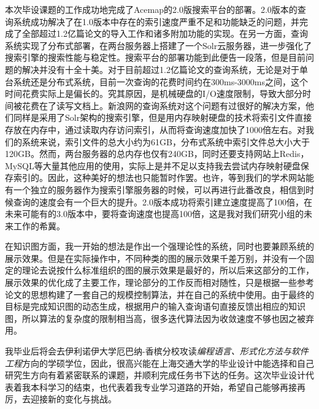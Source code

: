 
\begin{summary}

本次毕设课题的工作成功地完成了Acemap的2.0版搜索平台的部署。2.0版本的查询系统成功解决了在1.0版本中存在的索引速度严重不足和功能缺乏的问题，并完成了全部超过1.2亿篇论文的导入工作和诸多附加功能的实现。在另一方面，查询系统实现了分布式部署，在两台服务器上搭建了一个Solr云服务器，进一步强化了搜索引擎的搜索性能与稳定性。搜索平台的部署功能到此便告一段落，但是目前问题的解决并没有十全十美。对于目前超过1.2亿篇论文的查询系统，无论是对于单台系统还是分布式系统，目前一次查询的花费时间约在300ms-3000ms之间，这个时间花费实际上是偏长的。究其原因，是机械硬盘的I/O速度限制，导致大部分时间被花费在了读写文档上。新浪网的查询系统对这个问题有过很好的解决方案，他们同样是采用了Solr架构的搜索引擎，但是用内存映射硬盘的技术将索引文件直接存放在内存中，通过读取内存访问索引，从而将查询速度加快了1000倍左右。对我们的系统来说，索引文件的总大小约为61GB，分布式系统中索引文件总大小大于120GB。然而，两台服务器的总内存也仅有240GB，同时还要支持网站上Redis，MySQL等大量其他应用的使用，实际上是并不足以支持我去尝试内存映射硬盘保存索引的。因此，这种美好的想法也只能暂时作罢。也许，等到我们的学术网站能有一个独立的服务器作为搜索引擎服务器的时候，可以再进行此番改良，相信到时候查询的速度会有一个巨大的提升。2.0版本成功将索引建立速度提高了100倍，在未来可能有的3.0版本中，要将查询速度也提高100倍，这是我对我们研究小组的未来工作的希冀。

在知识图方面，我一开始的想法是作出一个强理论性的系统，同时也要兼顾系统的展示效果。但是在实际操作中，不同种类的图的展示效果千差万别，并没有一个固定的理论去说按什么标准组织的图的展示效果是最好的，所以后来这部分的工作，展示效果的优化成了主要工作，理论部分的工作反而相对随性，只是根据一些参考论文的思想构建了一套自己的规模控制算法，并在自己的系统中使用。由于最终的目标是完成知识图的动态生成，根据用户的输入查询语句直接反馈出相应的知识图，所以算法的复杂度的限制相当高，很多迭代算法因为收敛速度不够也因之被弃用。

我毕业后将会去伊利诺伊大学厄巴纳-香槟分校攻读\emph{编程语言、形式化方法与软件工程}方向的学硕学位，因此，很高兴能在上海交通大学的毕业设计中能选择和自己研究生方向有着紧密联系的课题，并顺利完成任务书下达的任务。这次毕业设计代表着我本科学习的结束，也代表着我专业学习道路的开始，希望自己能够再接再厉，去迎接新的变化与挑战。

\end{summary}
